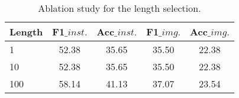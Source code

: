 \begin{table}[t]
\caption{Ablation study for the length selection.}

\label{tab:agent_ablation}
  \centering
\begin{adjustbox}{width=\linewidth}
  \begin{tabular}{l  c  c c c }
    \toprule
    Length & F1$\_inst.$ & Acc$\_inst.$ & F1$\_img.$ & Acc$\_img.$ \\
    \midrule 
1  & 52.38 & 35.65 & 35.50 & 22.38 \\
10  & 52.38 & 35.65 & 35.50 & 22.38 \\
100 &  58.14 & 41.13  & 37.07  & 23.54 \\

  \bottomrule

\end{tabular}
\end{adjustbox}

\end{table}

